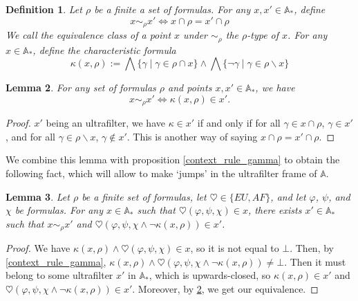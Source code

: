 \documentclass[11pt]{article}
\newcommand{\A}{{\mathbb A}}
\newtheorem{definition}{Definition}[section]
\newtheorem{lemma}[definition]{Lemma}
\begin{document}
\begin{definition}\label{rho_equiv}
    Let $\rho$ be a finite a set of formulas. For any $x,x'\in \A_*$, define \[x\sim_\rho x' \Leftrightarrow x\cap\rho=x'\cap\rho\] We call the equivalence class of a point $x$ under $\sim_\rho$ the \emph{$\rho$-type of $x$}. For any $x\in \A_*$, define the \emph{characteristic formula} \[\kappa(x,\rho):=\bigwedge\{\gamma\mid\gamma\in\rho\cap x\}\wedge\bigwedge\{\neg\gamma\mid\gamma\in\rho\backslash x\}\]
\end{definition}
\begin{lemma}\label{equiv_as_kappa}
    For any set of formulas $\rho$ and points $x,x'\in\A_*$, we have \[x\sim_\rho x' \Leftrightarrow \kappa(x,\rho)\in x'.\] 
\end{lemma}
\begin{proof}
    $x'$ being an ultrafilter, we have $\kappa\in x'$ if and only if for all $\gamma\in x\cap\rho$, $\gamma\in x'$, and for all $\gamma\in \rho\backslash x$, $\gamma\notin x'$. This is another way of saying $x\cap\rho = x'\cap\rho$.
\end{proof}
We combine this lemma with proposition \ref{context_rule_gamma} to obtain the following fact, which will allow to make `jumps' in the ultrafilter frame of $\A$.
\begin{lemma}\label{add_neg_kappa}
    Let $\rho$ be a finite set of formulas, let $\heartsuit\in\{EU,AF\}$, and let $\varphi$, $\psi$, and $\chi$ be formulas. For any $x\in\A_*$ such that $\heartsuit(\varphi,\psi,\chi)\in x$, there exists $x'\in\A_*$ such that $x\sim_\rho x'$ and $\heartsuit(\varphi,\psi,\chi\wedge\neg\kappa(x,\rho))\in x'$.
\end{lemma}
\begin{proof}
    We have $\kappa(x,\rho)\wedge\heartsuit(\varphi,\psi,\chi)\in x$, so it is not equal to $\bot$. Then, by \ref{context_rule_gamma}, $\kappa(x,\rho)\wedge\heartsuit(\varphi,\psi,\chi\wedge\neg\kappa(x,\rho))\not=\bot$. Then it must belong to some ultrafilter $x'$ in $\A_*$, which is upwards-closed, so $\kappa(x,\rho)\in x'$ and $\heartsuit(\varphi,\psi,\chi\wedge\neg\kappa(x,\rho))\in x'$. Moreover, by \ref{equiv_as_kappa}, we get our equivalence.
\end{proof}
\end{document}
